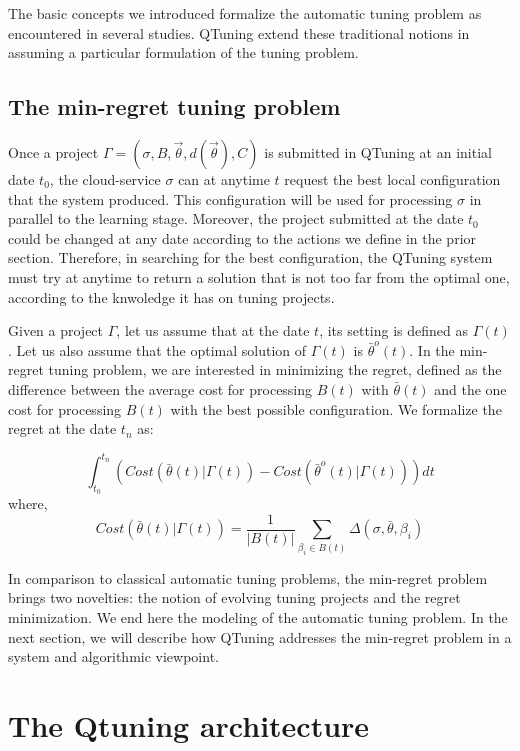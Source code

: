 \documentclass[10pt, conference, compsocconf]{IEEEtran}
\begin{document}
The basic concepts we introduced formalize the automatic tuning problem as encountered in several studies.
QTuning extend these traditional notions in assuming a particular formulation of the tuning problem.

\subsection{The min-regret tuning problem}

Once a project $ \Gamma = (\sigma, B, \vec{\theta}, d(\vec{\theta}), C)$ is submitted in QTuning at an initial
date $t_0$, the cloud-service $\sigma$ can at anytime $t$ request the best local configuration that the
system produced. This configuration will be used for processing $\sigma$ in parallel to the  learning stage.
Moreover, the project submitted at the date $t_0$ could be changed at any date according to the actions we define
in the prior section. Therefore, in searching for the best configuration, the QTuning system must try at anytime
to return a solution that is not too far from the optimal one, according to the knwoledge it has on tuning projects.

Given a project $\Gamma$, let us assume that at the date $t$, its setting is defined as $\Gamma(t)$.
Let us also assume that the optimal solution of $\Gamma(t)$ is $\bar{\theta}^o(t)$.
In the min-regret tuning problem, we are interested in minimizing the regret, defined as the
difference between the average cost for processing $B(t)$ with $\bar{\theta}(t)$ and the one cost for
processing $B(t)$ with the best possible configuration. We formalize the regret at the date $t_n$ as:

\[
\int_{t_0}^{t_n} \left( Cost(\bar{\theta}(t)| \Gamma(t)) - Cost(\bar{\theta}^o(t) | \Gamma(t)) \right) dt
\]
where,
\[
Cost(\bar{\theta}(t) | \Gamma(t)) = \frac{1}{|B(t)|}\sum_{\beta_i \in B(t)} \Delta(\sigma, \bar{\theta}, \beta_i)
\]


In comparison to classical automatic tuning problems, the min-regret problem brings two novelties:
the notion of evolving tuning projects and the regret minimization.
We end here the modeling of the automatic tuning problem. In the next section, we will describe how
QTuning addresses the min-regret problem in a system and algorithmic viewpoint.

\section{The Qtuning architecture} \label{Architecture}
\end{document}
